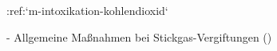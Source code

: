 :ref:`m-intoxikation-kohlendioxid`
\begin{itemize}
    -   Allgemeine Maßnahmen bei
Stickgas-Vergiftungen
()
\end{itemize}